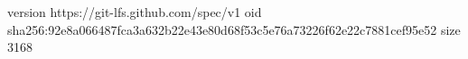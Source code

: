 version https://git-lfs.github.com/spec/v1
oid sha256:92e8a066487fca3a632b22e43e80d68f53c5e76a73226f62e22c7881cef95e52
size 3168
